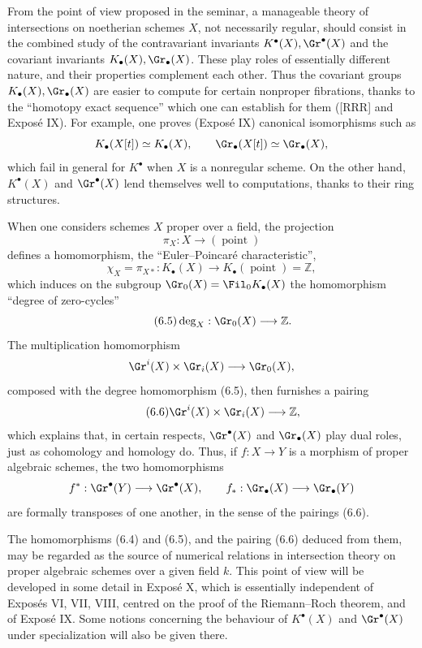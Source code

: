 From the point of view proposed in the seminar, a manageable theory of intersections on noetherian schemes $X$, not necessarily regular, should consist in the combined study of the contravariant invariants $K^\bullet(X),\Gr^\bullet(X)$ and the covariant invariants $K_\bullet(X),\Gr_\bullet(X)$. These play roles of essentially different nature, and their properties complement each other. Thus the covariant groups $K_\bullet(X),\Gr_\bullet(X)$ are easier to compute for certain nonproper fibrations, thanks to the ``homotopy exact sequence'' which one can establish for them ([RRR] and Expos\'e IX). For example, one proves (Expos\'e IX) canonical isomorphisms such as
\[
K_\bullet(X[t])\simeq K_\bullet(X),\qquad \Gr_\bullet(X[t])\simeq \Gr_\bullet(X),
\]
which fail in general for $K^\bullet$ when $X$ is a nonregular scheme. On the other hand, $K^\bullet(X)$ and $\Gr^\bullet(X)$ lend themselves well to computations, thanks to their ring structures.

When one considers schemes $X$ proper over a field, the projection
\[
\pi_X:X\longrightarrow (\operatorname{point})
\]
defines a homomorphism, the ``Euler--Poincar\'e characteristic'',
\begin{equation}\tag{6.4}
\chi_X=\pi_{X*}:K_\bullet(X)\longrightarrow K_\bullet(\operatorname{point})=\mathbb Z,
\end{equation}
which induces on the subgroup $\Gr_0(X)=\Fil_0K_\bullet(X)$ the homomorphism ``degree of zero-cycles''
\begin{equation}\tag{6.5}
\deg_X:\Gr_0(X)\longrightarrow \mathbb Z.
\end{equation}
The multiplication homomorphism
\[
\Gr^i(X)\times \Gr_i(X)\longrightarrow \Gr_0(X),
\]
composed with the degree homomorphism (6.5), then furnishes a pairing
\begin{equation}\tag{6.6}
\Gr^i(X)\times \Gr_i(X)\longrightarrow \mathbb Z,
\end{equation}
which explains that, in certain respects, $\Gr^\bullet(X)$ and $\Gr_\bullet(X)$ play dual roles, just as cohomology and homology do. Thus, if $f:X\to Y$ is a morphism of proper algebraic schemes, the two homomorphisms
\[
f^*:\Gr^\bullet(Y)\longrightarrow \Gr^\bullet(X),\qquad f_*:\Gr_\bullet(X)\longrightarrow \Gr_\bullet(Y)
\]
are formally transposes of one another, in the sense of the pairings (6.6).

The homomorphisms (6.4) and (6.5), and the pairing (6.6) deduced from them, may be regarded as the source of numerical relations in intersection theory on proper algebraic schemes over a given field $k$. This point of view will be developed in some detail in Expos\'e X, which is essentially independent of Expos\'es VI, VII, VIII, centred on the proof of the Riemann--Roch theorem, and of Expos\'e IX. Some notions concerning the behaviour of $K^\bullet(X)$ and $\Gr^\bullet(X)$ under specialization will also be given there.

